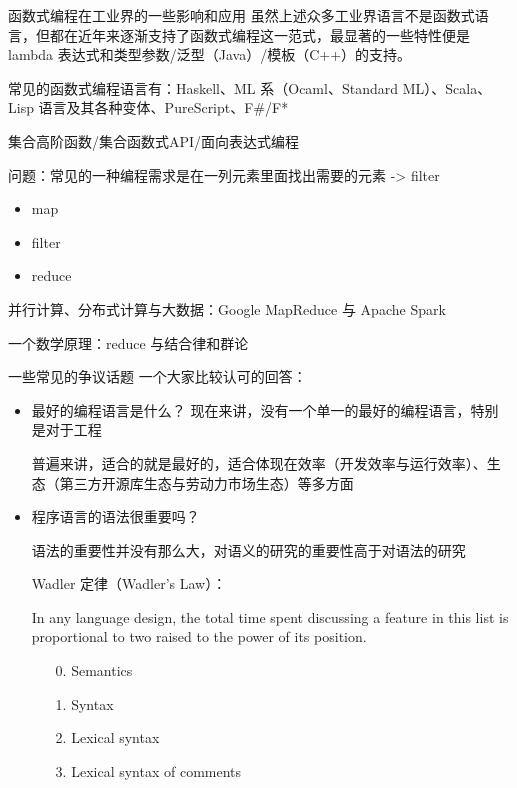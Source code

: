 \documentclass{beamer}
\begin{document}
\begin{frame}{函数式编程在工业界的一些影响和应用}
    虽然上述众多工业界语言不是函数式语言，但都在近年来逐渐支持了函数式编程这一范式，最显著的一些特性便是 lambda 表达式和类型参数/泛型（Java）/模板（C++）的支持。

    常见的函数式编程语言有：Haskell、ML 系（Ocaml、Standard ML）、Scala、Lisp 语言及其各种变体、PureScript、F\#/F*

    集合高阶函数/集合函数式API/面向表达式编程

    问题：常见的一种编程需求是在一列元素里面找出需要的元素 -> filter
    \begin{itemize}
        \item map
        \item filter
        \item reduce
    \end{itemize}

    并行计算、分布式计算与大数据：Google MapReduce 与 Apache Spark

    一个数学原理：reduce 与结合律和群论

\end{frame}

\begin{frame}{一些常见的争议话题}
    一个大家比较认可的回答：
    \begin{itemize}
        \item 最好的编程语言是什么？
              现在来讲，没有一个单一的最好的编程语言，特别是对于工程

              普遍来讲，适合的就是最好的，适合体现在效率（开发效率与运行效率）、生态（第三方开源库生态与劳动力市场生态）等多方面

        \item 程序语言的语法很重要吗？

              语法的重要性并没有那么大，对语义的研究的重要性高于对语法的研究

              Wadler 定律（Wadler's Law）\cite{wadlers_law_haskellwiki}：

              \begin{displayquote}
                  In any language design, the total time spent discussing a feature in this list is proportional to two raised to the power of its position.
                  \begin{enumerate}
                      \setcounter{enumi}{0}
                      \item[0.] Semantics
                      \item[1.] Syntax
                      \item[2.] Lexical syntax
                      \item[3.] Lexical syntax of comments
                  \end{enumerate}
              \end{displayquote}
    \end{itemize}

\end{frame}
\end{document}
